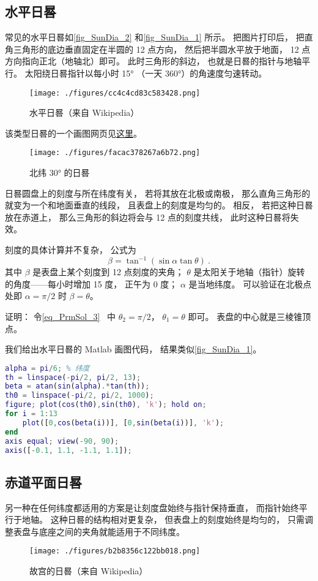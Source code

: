 
\begin{issues}
\end{issues}

\subsection{水平日晷}

常见的水平日晷如\autoref{fig_SunDia_2} 和\autoref{fig_SunDia_1} 所示。 把图片打印后， 把直角三角形的底边垂直固定在半圆的 12 点方向， 然后把半圆水平放于地面， 12 点方向指向正北（地轴北）即可。 此时三角形的斜边， 也就是日晷的指针与地轴平行。 太阳绕日晷指针以每小时 15° （一天 360°）的角速度匀速转动。

\begin{figure}[ht]
\centering
\texttt{[image: ./figures/cc4c4cd83c583428.png]}
\caption{水平日晷（来自 Wikipedia）} \label{fig_SunDia_2}
\end{figure}
该类型日晷的一个画图网页见\href{https://www.blocklayer.com/sundial.aspx}{这里}。
\begin{figure}[ht]
\centering
\texttt{[image: ./figures/facac378267a6b72.png]}
\caption{北纬 30° 的日晷} \label{fig_SunDia_1}
\end{figure}

日晷圆盘上的刻度与所在纬度有关， 若将其放在北极或南极， 那么直角三角形的就变为一个和地面垂直的线段， 且表盘上的刻度是均匀的。 相反， 若把这种日晷放在赤道上， 那么三角形的斜边将会与 12 点的刻度共线， 此时这种日晷将失效。

刻度的具体计算并不复杂， 公式为
\begin{equation}
\beta = \tan^{-1}(\sin\alpha \tan \theta)~.
\end{equation}
其中 $\beta$ 是表盘上某个刻度到 12 点刻度的夹角； $\theta$ 是太阳关于地轴（指针）旋转的角度——每小时增加 15 度， 正午为 0 度； $\alpha$ 是当地纬度。 可以验证在北极点处即 $\alpha = \pi/2$ 时 $\beta = \theta$。

证明： 令\autoref{eq_PrmSol_3}~ 中 $\theta_2 = \pi/2$， $\theta_1 = \theta$ 即可。 表盘的中心就是三棱锥顶点。

我们给出水平日晷的 Matlab 画图代码， 结果类似\autoref{fig_SunDia_1}。
\begin{lstlisting}[language=matlab, caption=sunDial.m]
alpha = pi/6; % 纬度
th = linspace(-pi/2, pi/2, 13);
beta = atan(sin(alpha).*tan(th));
th0 = linspace(-pi/2, pi/2, 1000);
figure; plot(cos(th0),sin(th0), 'k'); hold on;
for i = 1:13
    plot([0,cos(beta(i))], [0,sin(beta(i))], 'k');
end
axis equal; view(-90, 90);
axis([-0.1, 1.1, -1.1, 1.1]);
\end{lstlisting}

\subsection{赤道平面日晷}
另一种在任何纬度都适用的方案是让刻度盘始终与指针保持垂直， 而指针始终平行于地轴。 这种日晷的结构相对更复杂， 但表盘上的刻度始终是均匀的， 只需调整表盘与底座之间的夹角就能适用于不同纬度。
\begin{figure}[ht]
\centering
\texttt{[image: ./figures/b2b8356c122bb018.png]}
\caption{故宫的日晷（来自 Wikipedia）} \label{fig_SunDia_3}
\end{figure}
